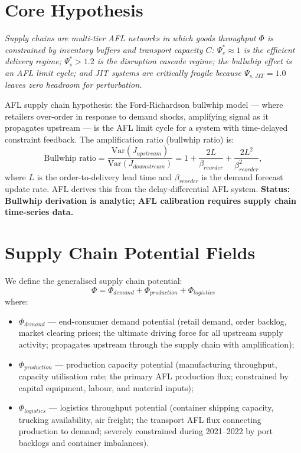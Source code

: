 \documentclass[11pt]{article}
\begin{document}
\section{Core Hypothesis}

\begin{center}
\textit{
Supply chains are multi-tier AFL networks in which goods throughput $\Phi$ is constrained by
inventory buffers and transport capacity $C$: $\Psi_s^* \approx 1$ is the efficient delivery regime;
$\Psi_s^* > 1.2$ is the disruption cascade regime; the bullwhip effect is an AFL limit cycle; and
JIT systems are critically fragile because $\Psi_{s,JIT} = 1.0$ leaves zero headroom for
perturbation.
}
\end{center}

AFL supply chain hypothesis: the Ford-Richardson bullwhip model --- where retailers over-order
in response to demand shocks, amplifying signal as it propagates upstream --- is the AFL limit
cycle for a system with time-delayed constraint feedback. The amplification ratio (bullwhip ratio)
is:
\begin{equation}
\text{Bullwhip ratio} = \frac{\text{Var}(J_{upstream})}{\text{Var}(J_{downstream})} = 1 + \frac{2L}{\beta_{reorder}} + \frac{2L^2}{\beta_{reorder}^2},
\end{equation}
where $L$ is the order-to-delivery lead time and $\beta_{reorder}$ is the demand forecast update
rate. AFL derives this from the delay-differential AFL system.
\textbf{Status: Bullwhip derivation is analytic; AFL calibration requires supply chain time-series data.}

\section{Supply Chain Potential Fields}

We define the generalised supply chain potential:
\begin{equation}
\Phi = \Phi_{demand} + \Phi_{production} + \Phi_{logistics}
\end{equation}
where:
\begin{itemize}
    \item $\Phi_{demand}$ --- end-consumer demand potential (retail demand, order backlog, market
          clearing prices; the ultimate driving force for all upstream supply activity; propagates
          upstream through the supply chain with amplification);
    \item $\Phi_{production}$ --- production capacity potential (manufacturing throughput, capacity
          utilisation rate; the primary AFL production flux; constrained by capital equipment,
          labour, and material inputs);
    \item $\Phi_{logistics}$ --- logistics throughput potential (container shipping capacity, trucking
          availability, air freight; the transport AFL flux connecting production to demand; severely
          constrained during 2021--2022 by port backlogs and container imbalances).
\end{itemize}
\end{document}
